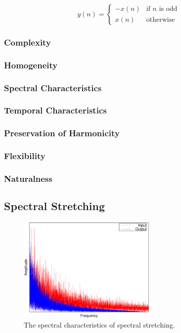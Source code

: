 		\begin{equation}
			y(n) = \begin{cases}
				-x(n) & \text{if $n$ is odd} \\
				x(n) & \text{otherwise}
			\end{cases}
			\label{eq:SpectralFolding}
		\end{equation}

		\subsubsection*{Complexity}
		\subsubsection*{Homogeneity}
		\subsubsection*{Spectral Characteristics}
		\subsubsection*{Temporal Characteristics}
		\subsubsection*{Preservation of Harmonicity}
		\subsubsection*{Flexibility}
		\subsubsection*{Naturalness}

	\subsection{Spectral Stretching}
	\label{sec:Excitation-SpectralStretching}

		\begin{figure}[h!]
			\centering
			\includegraphics[width=0.6\textwidth]{chapter3/Images/SpectralStretchingSpectrum.eps}
			\caption{The spectral characteristics of spectral stretching.}
			\label{fig:SpectralStretching}
		\end{figure}

